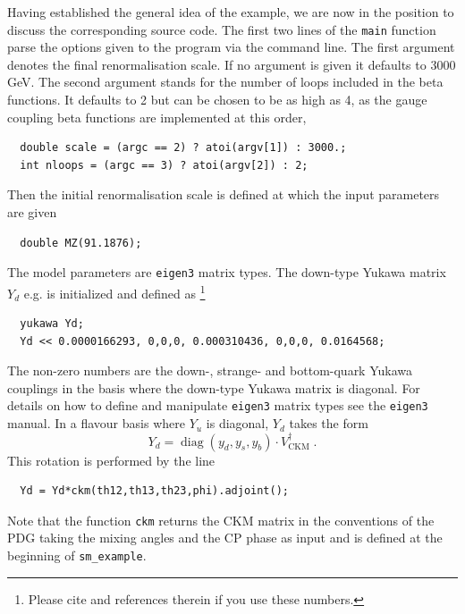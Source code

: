 \documentclass[preprint,12pt]{elsarticle}
\begin{document}
Having established the general idea of the example, we are now in the position to discuss the corresponding source code.
The first two lines of the \texttt{main} function parse the options given to the program via the command line. The first argument denotes the final renormalisation scale. If no argument is given it defaults to 3000 GeV. The
second argument stands for the number of loops included in the beta functions. It defaults to 2 but can be chosen to be as high as 4, as the gauge coupling beta functions are implemented at this order,
\begin{lstlisting}
  double scale = (argc == 2) ? atoi(argv[1]) : 3000.;
  int nloops = (argc == 3) ? atoi(argv[2]) : 2;
\end{lstlisting}
Then the initial renormalisation scale is defined at which the input parameters are given
\begin{lstlisting}
  double MZ(91.1876);
\end{lstlisting}
The model parameters are \texttt{eigen3} matrix types. The down-type Yukawa matrix $Y_d$ e.g. is initialized and defined as \footnote{Please cite \cite{Deppisch:2018flu} and references therein if you use these numbers.}
\begin{lstlisting}
  yukawa Yd; 
  Yd << 0.0000166293, 0,0,0, 0.000310436, 0,0,0, 0.0164568;
\end{lstlisting}
The non-zero numbers are the down-, strange- and bottom-quark Yukawa couplings in the basis where the down-type Yukawa matrix is diagonal.
For details on how to define and manipulate  \texttt{eigen3} matrix types see the \texttt{eigen3} manual. In a flavour basis where $Y_u$ is diagonal, $Y_d$ takes the form
\begin{equation}
    Y_d = \operatorname{diag}(y_d,y_s,y_b) \cdot V_{\mathrm{CKM}}^\dagger\;.
\end{equation}
This rotation is performed by the line
\begin{lstlisting}
  Yd = Yd*ckm(th12,th13,th23,phi).adjoint();
\end{lstlisting}
Note that the function \texttt{ckm} returns the CKM matrix in the conventions of the PDG \cite{Patrignani:2016xqp} taking the mixing angles and the CP phase as input and is defined at the beginning of \texttt{sm\_example}.
\end{document}
